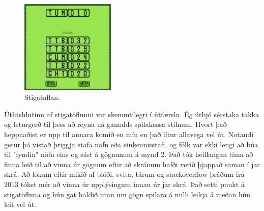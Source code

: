 \documentclass[a4paper]{paper}
\begin{document}
\begin{figure}
    \vspace{-\baselineskip}
    \includegraphics[width=0.4\textwidth]{imgs/stigatafla.png}
    \caption{\label{Mynd:stigatafla}Stigataflan.}
\end{figure}%
Útlitshlutinn af stigatöflunni var skemmtilegri í útfærslu.
Ég útbjó sérstaka takka og leturgerð til þess að reyna ná gamalds spilakassa stílnum. 
Hvort það heppnaðist er upp til annara komið en mín en það lítur allavega vel út.
Notandi getur þá vistað þriggja stafa nafn eða einkennisstafi, 
og fólk var ekki lengi að búa til "fyndin" nöfn eins og sást á gögnunum á mynd 2. 
Það tók heillangan tíma að finna leið til að vinna úr gögnum eftir að skránum hafði verið þjappað saman í jar skrá.
Að lokum eftir mikið af blóði, svita, tárum og stackoverflow þráðum frá 2013 tókst mér að vinna úr upplýsingum innan úr jar skrá.
Það setti punkt á stigatöfluna og hún gat haldið utan um gögn spilara á milli leikja á meðan hún leit vel út.\\
\end{document}

